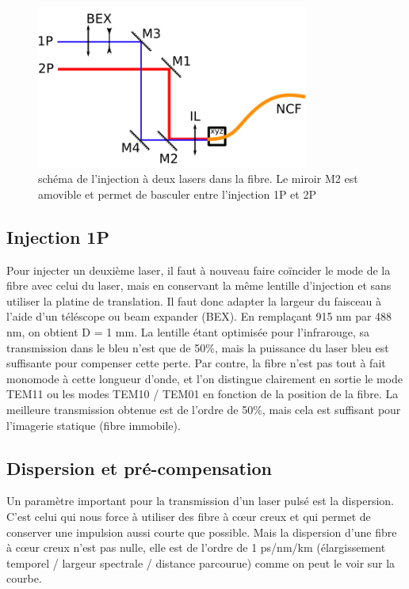 \begin{figure}
\centering
\includegraphics[width=0.8\textwidth]{./files/injection.svg.png}
\caption{schéma de l'injection à deux lasers dans la fibre. Le miroir M2 est amovible et permet de basculer entre l'injection 1P et 2P}
\end{figure}

\subsection{Injection 1P}

Pour injecter un deuxième laser, il faut à nouveau faire coïncider le mode de la fibre avec celui du laser, mais en conservant la même lentille d'injection et sans utiliser la platine de translation. Il faut donc adapter la largeur du faisceau à l'aide d'un téléscope ou beam expander (BEX). En remplaçant 915 nm par 488 nm, on obtient D = 1 mm. La lentille étant optimisée pour l'infrarouge, sa transmission dans le bleu n'est que de 50\%, mais la puissance du laser bleu est suffisante pour compenser cette perte. Par contre, la fibre n'est pas tout à fait monomode à cette longueur d'onde, et l'on distingue clairement en sortie le mode TEM11 ou les modes TEM10 / TEM01 en fonction de la position de la fibre. La meilleure transmission obtenue est de l'ordre de 50\%, mais cela est suffisant pour l'imagerie statique (fibre immobile).

\subsection{Dispersion et pré-compensation}

Un paramètre important pour la transmission d'un laser pulsé est la dispersion. C'est celui qui nous force à utiliser des fibre à cœur creux et qui permet de conserver une impulsion aussi courte que possible. Mais la dispersion d'une fibre à cœur creux n'est pas nulle, elle est de l'ordre de 1 ps/nm/km (élargissement temporel / largeur spectrale / distance parcourue) comme on peut le voir sur la courbe.

